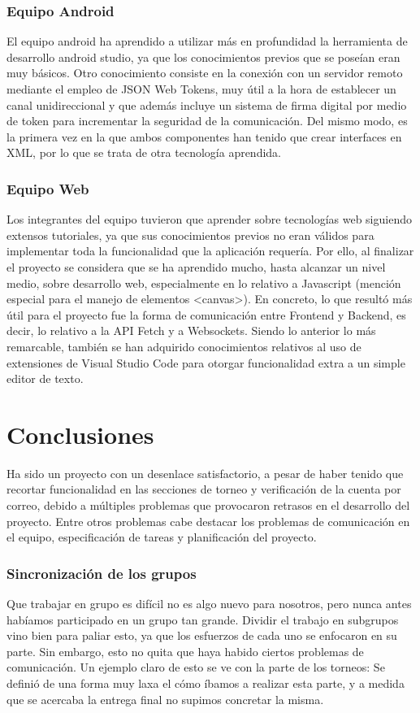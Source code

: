 \documentclass{article}
\begin{document}
\subsubsection*{Equipo Android}
El equipo android ha aprendido a utilizar más en profundidad la herramienta de desarrollo android studio, ya que los conocimientos previos que se poseían eran muy básicos.
Otro conocimiento consiste en la conexión con un servidor remoto mediante el empleo de JSON Web Tokens, muy útil a la hora de establecer un canal unidireccional y que además incluye un sistema de firma digital por medio de token para incrementar la seguridad de la comunicación.
Del mismo modo, es la primera vez en la que ambos componentes han tenido que crear interfaces en XML, por lo que se trata de otra tecnología aprendida.

\subsubsection*{Equipo Web}
Los integrantes del equipo tuvieron que aprender sobre tecnologías web siguiendo extensos tutoriales, ya que sus conocimientos previos no eran válidos para implementar toda la funcionalidad que la aplicación requería. Por ello, al finalizar el proyecto se considera que se ha aprendido mucho, hasta alcanzar un nivel medio, sobre desarrollo web, especialmente en lo relativo a Javascript (mención especial para el manejo de elementos <canvas>). En concreto, lo que resultó más útil para el proyecto fue la forma de comunicación entre Frontend y Backend, es decir, lo relativo a la API Fetch y a Websockets.
Siendo lo anterior lo más remarcable, también se han adquirido conocimientos relativos al uso de extensiones de Visual Studio Code para otorgar funcionalidad extra a un simple editor de texto.


\section{Conclusiones}
Ha sido un proyecto con un desenlace satisfactorio, a pesar de haber tenido que recortar funcionalidad en las secciones de torneo y verificación de la cuenta por correo, debido a múltiples problemas que provocaron retrasos en el desarrollo del proyecto. Entre otros problemas cabe destacar los problemas de comunicación en el equipo, especificación de tareas y planificación del proyecto.

\subsubsection*{Sincronización de los grupos}
Que trabajar en grupo es difícil no es algo nuevo para nosotros, pero nunca antes habíamos participado en un grupo tan grande. Dividir el trabajo en subgrupos vino bien para paliar esto, ya que los esfuerzos de cada uno se enfocaron en su parte.
Sin embargo, esto no quita que haya habido ciertos problemas de comunicación. Un ejemplo claro de esto se ve con la parte de los torneos: Se definió de una forma muy laxa el cómo íbamos a realizar esta parte, y a medida que se acercaba la entrega final no supimos concretar la misma.
\end{document}
